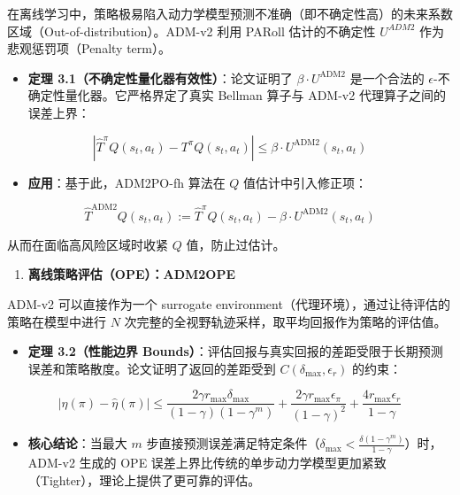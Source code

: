 在离线学习中，策略极易陷入动力学模型预测不准确（即不确定性高）的未来系数区域（Out-of-distribution）。ADM-v2 利用 PARoll 估计的不确定性 \(U^{ADM2}\) 作为悲观惩罚项（Penalty term）。

\begin{itemize}
\tightlist
\item
  \textbf{定理 3.1（不确定性量化器有效性）}：论文证明了 \(\beta\cdot U^{\mathrm{ADM2}}\) 是一个合法的 \(\epsilon\)-不确定性量化器。它严格界定了真实 Bellman 算子与 ADM-v2 代理算子之间的误差上界：
\end{itemize}

\[
\left|
\hat{T}^{\pi}Q(s_t,a_t)
-
T^{\pi}Q(s_t,a_t)
\right|
\le
\beta\cdot U^{\mathrm{ADM2}}(s_t,a_t)
\]

\begin{itemize}
\tightlist
\item
  \textbf{应用}：基于此，ADM2PO-fh 算法在 \(Q\) 值估计中引入修正项：
\end{itemize}

\[
\hat{T}^{\mathrm{ADM2}}Q(s_t,a_t)
:=
\hat{T}^{\pi}Q(s_t,a_t)
-
\beta\cdot U^{\mathrm{ADM2}}(s_t,a_t)
\]

从而在面临高风险区域时收紧 \(Q\) 值，防止过估计。

\begin{enumerate}
\def\labelenumi{\arabic{enumi}.}
\setcounter{enumi}{1}
\tightlist
\item
  \textbf{离线策略评估（OPE）：ADM2OPE}
\end{enumerate}

ADM-v2 可以直接作为一个 surrogate environment（代理环境），通过让待评估的策略在模型中进行 \(N\) 次完整的全视野轨迹采样，取平均回报作为策略的评估值。

\begin{itemize}
\tightlist
\item
  \textbf{定理 3.2（性能边界 Bounds）}：评估回报与真实回报的差距受限于长期预测误差和策略散度。论文证明了返回的差距受到 \(C(\delta_{\max},\epsilon_r)\) 的约束：
\end{itemize}

\[
\left|
\eta(\pi)-\hat{\eta}(\pi)
\right|
\le
\frac{2\gamma r_{\max}\delta_{\max}}{(1-\gamma)(1-\gamma^m)}
+
\frac{2\gamma r_{\max}\epsilon_\pi}{(1-\gamma)^2}
+
\frac{4r_{\max}\epsilon_r}{1-\gamma}
\]

\begin{itemize}
\tightlist
\item
  \textbf{核心结论}：当最大 \(m\) 步直接预测误差满足特定条件（\(\delta_{\max}\lt\frac{\delta(1-\gamma^m)}{1-\gamma}\)）时，ADM-v2 生成的 OPE 误差上界比传统的单步动力学模型更加紧致（Tighter），理论上提供了更可靠的评估。
\end{itemize}

